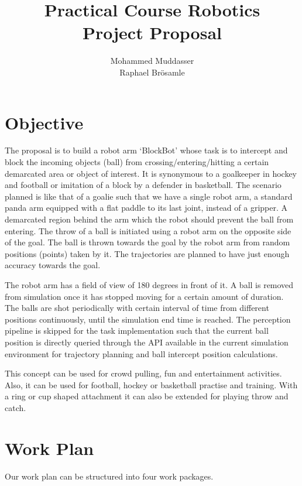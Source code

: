 \documentclass[12pt,pdftex,a4paper]{article}
\begin{document}
\title{Practical Course Robotics\\Project Proposal}
\author{Mohammed Muddasser\\Raphael Brösamle}
\date{}
\maketitle
\section*{Objective}
The proposal is to build a robot arm ‘BlockBot’ whose task is to intercept and block the incoming objects (ball) from crossing/entering/hitting a certain demarcated area or object of interest. 
It is synonymous to a goalkeeper in hockey and football or imitation of a block by a defender in basketball. 
The scenario planned is like that of a goalie such that we have a single robot arm, a standard panda arm equipped with a flat paddle to its last joint, instead of a gripper. 
A demarcated region behind the arm which the robot should prevent the ball from entering. 
The throw of a ball is initiated using a robot arm on the opposite side of the goal. 
The ball is thrown towards the goal by the robot arm from random positions (points) taken by it. 
The trajectories are planned to have just enough accuracy towards the goal.

The robot arm has a field of view of 180 degrees in front of it. 
A ball is removed from simulation once it has stopped moving for a certain amount of duration. 
The balls are shot periodically with certain interval of time from different positions continuously, until the simulation end time is reached. 
The perception pipeline is skipped for the task implementation such that the current ball position is directly queried through the API available in the current simulation environment for trajectory planning and ball intercept position calculations.

This concept can be used for crowd pulling, fun and entertainment activities. 
Also, it can be used for football, hockey or basketball practise and training. 
With a ring or cup shaped attachment it can also be extended for playing throw and catch.

\section*{Work Plan}
Our work plan can be structured into four work packages.
\end{document}
